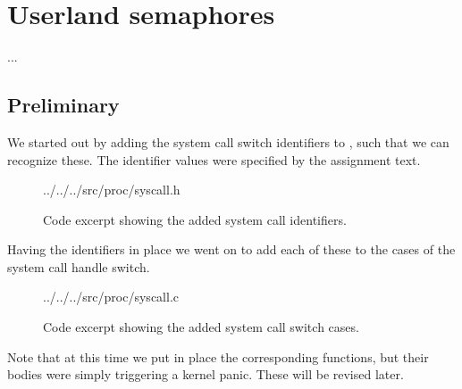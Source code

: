 %
%
%

\section{Userland semaphores}
...

\subsection{Preliminary}
We started out by adding the system call switch identifiers to
, such that we can recognize these. The identifier values
were specified by the assignment text.
\begin{figure}[H]
    
    {../../../src/proc/syscall.h}
    \label{code:syscall-identifiers}
    \caption{Code excerpt showing the added system call identifiers.}
\end{figure}
Having the identifiers in place we went on to add each of these to the cases
of the system call handle switch.
\begin{figure}[H]
    
    {../../../src/proc/syscall.c}
    \label{code:syscall-switch}
    \caption{Code excerpt showing the added system call switch cases.}
\end{figure}
Note that at this time we put in place the corresponding functions, but their
bodies were simply triggering a kernel panic. These will be revised later.

